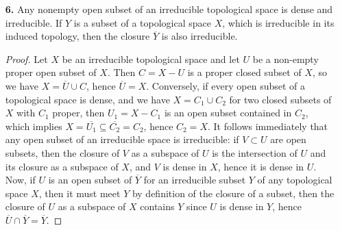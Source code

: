 \documentclass[a4paper]{article}
\begin{document}
\begin{enumerate} [label=\textbf{\arabic*.}, leftmargin=0em]
          \begin{proof}
              We claim that
              \begin{equation*}
                  Y = Z((x, y)) \cup Z((x, z)) \cup Z((x^2 - y, z - 1)).
              \end{equation*}
              It is clear the subsets $Z((x, y))$ and $Z((x, z))$ are irreducible. What is less obvious is the irreducibility of $Z((x^2 - y, z - 1))$. Observe that
              \begin{equation*}
                  \frac{k[x, y, z]}{(x^2 - y, z - 1)} \cong \frac{k[x, y]}{(x^2 - y)} \cong k[x, x^2] \cong k[x],
              \end{equation*}
              hence $(x^2 - y, z - 1)$ is a prime ideal, hence $Z((x^2 - y, z - 1))$ is irreducible.
              If $P = (u, v, w) \in Y$, then $u^2 - vw = 0$ and $uw - u = 0$, so by the second equation either $u = 0$ or $u = 1$. If $u = 0$, either $v = 0$ or $w = 0$, which implies $P \in Z((x, y))$ or $P \in Z((x, z))$. If $u = 1$, then we have $P \in Z((x^2 - y, z - 1))$. The converse direction follows in similar fashion.
          \end{proof}

    \item[\textbf{6.}] Any nonempty open subset of an irreducible topological space is dense and irreducible. If $Y$ is a subset of a topological space $X$, which is irreducible in its induced topology, then the closure $\overline{Y}$ is also irreducible.

          \begin{proof}
              Let $X$ be an irreducible topological space and let $U$ be a non-empty proper open subset of $X$.
              Then $C = X - U$ is a proper closed subset of $X$, so we have $X = \overline{U} \cup C$, hence $\overline{U} = X$.
              Conversely, if every open subset of a topological space is dense, and we have $X = C_1 \cup C_2$ for two closed subsets of $X$ with $C_1$ proper, then $U_1 = X - C_1$ is an open subset contained in $C_2$, which implies $X = \overline{U_1} \subseteq \overline{C_2} = C_2$, hence $C_2 = X$.
              It follows immediately that any open subset of an irreducible space is irreducible: if $V \subset U$ are open subsets, then the closure of $V$ as a subspace of $U$ is the intersection of $U$ and its closure as a subspace of $X$, and $V$ is dense in $X$, hence it is dense in $U$.
              Now, if $U$ is an open subset of $\overline{Y}$ for an irreducible subset $Y$ of any topological space $X$, then it must meet $Y$ by definition of the closure of a subset, then the closure of $U$ as a subspace of $X$ contains $Y$ since $U$ is dense in $Y$, hence $\overline{U} \cap \overline{Y} = \overline{Y}$.
          \end{proof}


\end{enumerate}
\end{document}
